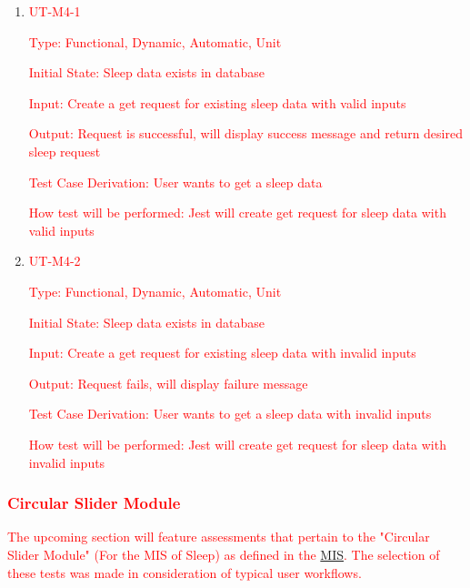 \documentclass[12pt, titlepage]{article}
\begin{document}
\begin{enumerate}

	\item{\textcolor{red}{UT-M4-1\\}}

	\textcolor{red}{Type: Functional, Dynamic, Automatic, Unit}

	\textcolor{red}{Initial State: Sleep data exists in database}

	\textcolor{red}{Input: Create a get request for existing sleep data with valid inputs}

	\textcolor{red}{Output: Request is successful, will display success message and return desired sleep request}

	\textcolor{red}{Test Case Derivation: User wants to get a sleep data}

	\textcolor{red}{How test will be performed: Jest will create get request for sleep data with valid inputs}

	\item{\textcolor{red}{UT-M4-2\\}}

	\textcolor{red}{Type: Functional, Dynamic, Automatic, Unit}

	\textcolor{red}{Initial State: Sleep data exists in database}

	\textcolor{red}{Input: Create a get request for existing sleep data with invalid inputs}

	\textcolor{red}{Output: Request fails, will display failure message}

	\textcolor{red}{Test Case Derivation: User wants to get a sleep data with invalid inputs}

	\textcolor{red}{How test will be performed: Jest will create get request for sleep data with invalid inputs}

\end{enumerate}

\subsubsection{\textcolor{red}{Circular Slider Module}}

\textcolor{red}{The upcoming section will feature assessments that pertain to the "Circular Slider Module" (For the MIS of Sleep) as defined in the \href{https://github.com/BillNguyen1999/REVITALIZE/blob/main/docs/Design/SoftDetailedDes/MIS.pdf}{\color{blue}MIS}. The selection of these tests was made in consideration of typical user workflows.}
\end{document}
